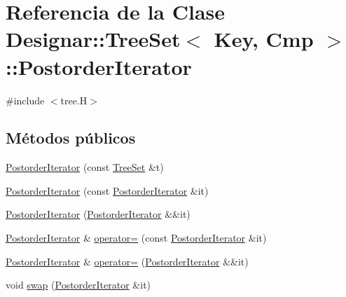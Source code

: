 \hypertarget{class_designar_1_1_tree_set_1_1_postorder_iterator}{}\section{Referencia de la Clase Designar\+:\+:Tree\+Set$<$ Key, Cmp $>$\+:\+:Postorder\+Iterator}
\label{class_designar_1_1_tree_set_1_1_postorder_iterator}


{\ttfamily \#include $<$tree.\+H$>$}

\subsection*{Métodos públicos}
\begin{DoxyCompactItemize}
\item 
\hyperlink{class_designar_1_1_tree_set_1_1_postorder_iterator_a9dadd6ef8148a2667500458504478936}{Postorder\+Iterator} (const \hyperlink{class_designar_1_1_tree_set}{Tree\+Set} \&t)
\item 
\hyperlink{class_designar_1_1_tree_set_1_1_postorder_iterator_a19efa5739500f88e268d0dc4cb4eb947}{Postorder\+Iterator} (const \hyperlink{class_designar_1_1_tree_set_1_1_postorder_iterator}{Postorder\+Iterator} \&it)
\item 
\hyperlink{class_designar_1_1_tree_set_1_1_postorder_iterator_a1e347626f3b593f3c1c97ac4080456ac}{Postorder\+Iterator} (\hyperlink{class_designar_1_1_tree_set_1_1_postorder_iterator}{Postorder\+Iterator} \&\&it)
\item 
\hyperlink{class_designar_1_1_tree_set_1_1_postorder_iterator}{Postorder\+Iterator} \& \hyperlink{class_designar_1_1_tree_set_1_1_postorder_iterator_abd8e22b1014d273adda6b8a7ee273db7}{operator=} (const \hyperlink{class_designar_1_1_tree_set_1_1_postorder_iterator}{Postorder\+Iterator} \&it)
\item 
\hyperlink{class_designar_1_1_tree_set_1_1_postorder_iterator}{Postorder\+Iterator} \& \hyperlink{class_designar_1_1_tree_set_1_1_postorder_iterator_ae7babf2b4c789bfb84d7e51dab0356bf}{operator=} (\hyperlink{class_designar_1_1_tree_set_1_1_postorder_iterator}{Postorder\+Iterator} \&\&it)
\item 
void \hyperlink{class_designar_1_1_tree_set_1_1_postorder_iterator_a39439b63a9a8dc8098b6c8359231bbd5}{swap} (\hyperlink{class_designar_1_1_tree_set_1_1_postorder_iterator}{Postorder\+Iterator} \&it)
\item 

\end{DoxyCompactItemize}
